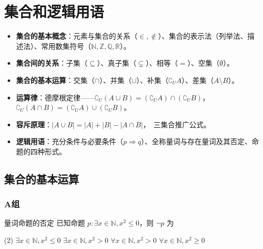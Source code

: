 \chapter{集合和逻辑用语}
\setcounter{choicecounter}{0}

\begin{knowledgeframe}
\begin{itemize}
	\item \textbf{集合的基本概念}：元素与集合的关系（$\in, \notin$）、集合的表示法（列举法、描述法）、常用数集符号（$\mathbb{N}, \mathbb{Z}, \mathbb{Q}, \mathbb{R}$）。
	\item \textbf{集合间的关系}：子集（$\subseteq$）、真子集（$\subsetneq$）、相等（$=$）、空集（$\emptyset$）。
	\item \textbf{集合的基本运算}：交集（$\cap$）、并集（$\cup$）、补集（$\complement_U A$）、差集（$A \setminus B$）。
	\item \textbf{运算律}：德摩根定律——$\complement_U(A \cup B) = (\complement_U A) \cap (\complement_U B)$，\ $\complement_U(A \cap B) = (\complement_U A) \cup (\complement_U B)$。
	\item \textbf{容斥原理}：$|A \cup B| = |A| + |B| - |A \cap B|$，\ 三集合推广公式。
	\item \textbf{逻辑用语}：充分条件与必要条件（$p \Rightarrow q$）、全称量词与存在量词及其否定、命题的四种形式。
\end{itemize}
\end{knowledgeframe}

\section{集合的基本运算}

\startexercise

\subsection*{A组}

\begin{choice}{}{量词命题的否定}
	已知命题 $p: \exists x \in \mathbb{N}, x^2 \le 0$，则 $\neg p$ 为
	\begin{tasks}(2)
		\task $\exists x \in \mathbb{N}, x^2 \le 0$
		\task $\exists x \in \mathbb{N}, x^2 > 0$
		\task $\forall x \in \mathbb{N}, x^2 > 0$
		\task $\forall x \in \mathbb{N}, x^2 \ge 0$
	\end{tasks}
\end{choice}

